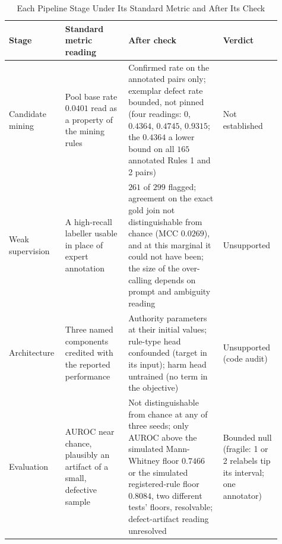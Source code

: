 \begin{table}[!htbp]
\centering
\caption{Each Pipeline Stage Under Its Standard Metric and After Its Check}
\label{tab:disc-spine}
\footnotesize
\begin{tabular}{@{}>{\tblragged}p{0.18\linewidth}>{\tblragged}p{0.22\linewidth}>{\tblragged}p{0.33\linewidth}>{\tblragged}p{0.18\linewidth}@{}}
\toprule
\textbf{Stage} & \textbf{Standard metric reading} & \textbf{After check} & \textbf{Verdict} \\
\midrule
Candidate mining & Pool base rate $0.0401$ read as a property of the mining rules & Confirmed rate on the annotated pairs only; exemplar defect rate bounded, not pinned (four readings: $0$, $0.4364$, $0.4745$, $0.9315$; the $0.4364$ a lower bound on all $165$ annotated Rules 1 and 2 pairs) & Not established \\
\addlinespace
Weak supervision & A high-recall labeller usable in place of expert annotation & $261$ of $299$ flagged; agreement on the exact gold join not distinguishable from chance (MCC $0.0269$), and at this marginal it could not have been; the size of the over-calling depends on prompt and ambiguity reading & Unsupported \\
\addlinespace
Architecture & Three named components credited with the reported performance & Authority parameters at their initial values; rule-type head confounded (target in its input); harm head untrained (no term in the objective) & Unsupported (code audit) \\
\addlinespace
Evaluation & AUROC near chance, plausibly an artifact of a small, defective sample & Not distinguishable from chance at any of three seeds; only AUROC above the simulated Mann-Whitney floor $0.7466$ or the simulated registered-rule floor $0.8084$, two different tests' floors, resolvable; defect-artifact reading unresolved & Bounded null (fragile: 1 or 2 relabels tip its interval; one annotator) \\
\bottomrule
\end{tabular}
\end{table}

